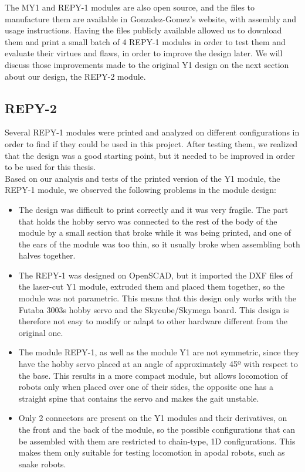 The MY1 and REPY-1 modules are also open source, and the files to manufacture them are available in Gonzalez-Gomez's website, with assembly and usage instructions. Having the files publicly available allowed us to download them and print a small batch of 4 REPY-1 modules in order to test them and evaluate their virtues and flaws, in order to improve the design later. We will discuss those improvements made to the original Y1 design on the next section about our design, the REPY-2 module.\\

\newpage
\subsection{REPY-2}
\label{hardware_repy-2.x}

Several REPY-1 modules were printed and analyzed on different configurations in order to find if they could be used in this project. After testing them, we realized that the design was a good starting point, but it needed to be improved in order to be used for this thesis.\\

Based on our analysis and tests of the printed version of the Y1 module, the REPY-1 module, we observed the following problems in the module design:

\begin{itemize}
	\item The design was difficult to print correctly and it was very fragile. The part that holds the hobby servo was connected to the rest of the body of the module by a small section that broke while it was being printed, and one of the ears of the module was too thin, so it usually broke when assembling both halves together. 
	
	\item The REPY-1 was designed on OpenSCAD, but it imported the DXF files of the laser-cut Y1 module, extruded them and placed them together, so the module was not parametric. This means that this design only works with the Futaba 3003s hobby servo and the Skycube/Skymega board. This design is therefore not easy to modify or adapt to other hardware different from the original one.
	
	\item The module REPY-1, as well as the module Y1 are not symmetric, since they have the hobby servo placed at an angle of approximately 45º with respect to the base. This results in a more compact module, but allows locomotion of robots only when placed over one of their sides, the opposite one has a straight spine that contains the servo and makes the gait unstable.
	  
	\item Only 2 connectors are present on the Y1 modules and their derivatives, on the front and the back of the module, so the possible configurations that can be assembled with them are restricted to chain-type, 1D configurations. This makes them only suitable for testing locomotion in apodal robots, such as snake robots.
	  
\end{itemize}

